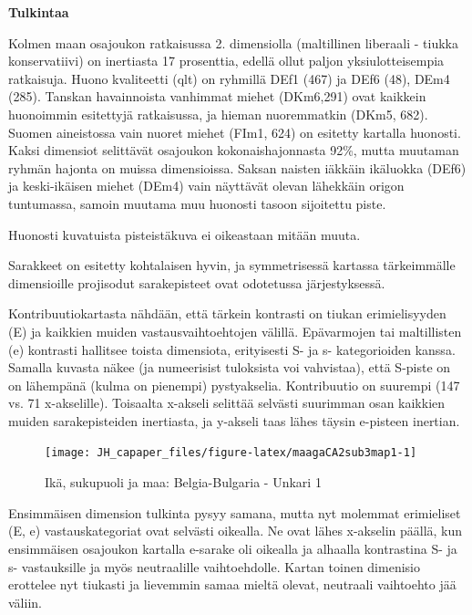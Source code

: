 \documentclass[
  finnish,
]{book}
\begin{document}
\textbf{Tulkintaa}

Kolmen maan osajoukon ratkaisussa 2. dimensiolla (maltillinen liberaali - tiukka konservatiivi) on
inertiasta 17 prosenttia, edellä ollut paljon yksiulotteisempia ratkaisuja. Huono kvaliteetti (qlt)
on ryhmillä DEf1 (467) ja DEf6 (48), DEm4 (285). Tanskan havainnoista vanhimmat miehet
(DKm6,291) ovat kaikkein huonoimmin esitettyjä ratkaisussa, ja hieman nuoremmatkin
(DKm5, 682). Suomen aineistossa vain nuoret miehet (FIm1, 624) on esitetty kartalla
huonosti. Kaksi dimensiot selittävät osajoukon kokonaishajonnasta 92\%, mutta muutaman
ryhmän hajonta on muissa dimensioissa. Saksan naisten iäkkäin ikäluokka (DEf6)
ja keski-ikäisen miehet (DEm4) vain näyttävät olevan lähekkäin origon tuntumassa,
samoin muutama muu huonosti tasoon sijoitettu piste.

Huonosti kuvatuista pisteistäkuva ei oikeastaan mitään muuta.

Sarakkeet on esitetty kohtalaisen hyvin, ja symmetrisessä kartassa tärkeimmälle
dimensioille projisodut sarakepisteet ovat odotetussa järjestyksessä.

Kontribuutiokartasta nähdään, että tärkein kontrasti on tiukan erimielisyyden (E)
ja kaikkien muiden vastausvaihtoehtojen välillä. Epävarmojen tai maltillisten (e)
kontrasti hallitsee toista dimensiota, erityisesti S- ja s- kategorioiden kanssa.
Samalla kuvasta näkee (ja numeerisist tuloksista voi vahvistaa), että S-piste on
on lähempänä (kulma on pienempi) pystyakselia. Kontribuutio on suurempi (147 vs.
71 x-akselille). Toisaalta x-akseli selittää selvästi suurimman osan kaikkien muiden
sarakepisteiden inertiasta, ja y-akseli taas lähes täysin e-pisteen inertian.

\begin{figure}

{\centering \texttt{[image: JH\_capaper\_files/figure-latex/maagaCA2sub3map1-1]} 

}

\caption{Ikä, sukupuoli ja maa: Belgia-Bulgaria - Unkari 1}\label{fig:maagaCA2sub3map1}
\end{figure}

Ensimmäisen dimension tulkinta pysyy samana, mutta nyt molemmat erimieliset
(E, e) vastauskategoriat ovat selvästi oikealla. Ne ovat lähes x-akselin päällä,
kun ensimmäisen osajoukon kartalla e-sarake oli oikealla ja alhaalla kontrastina
S- ja s- vastauksille ja myös neutraalille vaihtoehdolle. Kartan toinen dimenisio
erottelee nyt tiukasti ja lievemmin samaa mieltä olevat, neutraali vaihtoehto
jää väliin.
\end{document}
